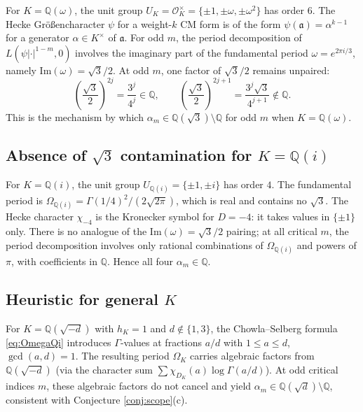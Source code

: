 \documentclass[10pt]{article}
\theoremstyle{definition}
\newcommand{\Q}{\mathbb{Q}}
\newcommand{\OO}{\mathcal{O}}
\newcommand{\OmI}{\Omega_{\Q(i)}}
\begin{document}
For $K = \Q(\omega)$, the unit group $U_K = \OO_K^\times = \{\pm 1, \pm\omega, \pm\omega^2\}$
has order $6$.  The Hecke Gr\"{o}{\ss}encharacter $\psi$ for a weight-$k$ CM form is
of the form $\psi(\mathfrak{a}) = \alpha^{k-1}$ for a generator $\alpha \in K^\times$
of $\mathfrak{a}$.  For odd $m$, the period decomposition of $L(\psi|\cdot|^{1-m}, 0)$
involves the imaginary part of the fundamental period $\omega = e^{2\pi i/3}$, namely
$\mathrm{Im}(\omega) = \sqrt{3}/2$.  At odd $m$, one factor of $\sqrt{3}/2$ remains
unpaired:
\[
  \left(\frac{\sqrt{3}}{2}\right)^{2j} = \frac{3^j}{4^j} \in \Q,
  \qquad
  \left(\frac{\sqrt{3}}{2}\right)^{2j+1} = \frac{3^j\sqrt{3}}{4^{j+1}} \notin \Q.
\]
This is the mechanism by which $\alpha_m \in \Q(\sqrt{3})\setminus\Q$ for odd $m$
when $K = \Q(\omega)$.

\subsection{Absence of \texorpdfstring{$\sqrt{3}$}{sqrt(3)} contamination for \texorpdfstring{$K=\Q(i)$}{K=Q(i)}}

For $K = \Q(i)$, the unit group $U_{\Q(i)} = \{\pm 1, \pm i\}$ has order $4$.
The fundamental period is $\OmI = \Gamma(1/4)^2/(2\sqrt{2\pi})$, which is real
and contains no $\sqrt{3}$.  The Hecke character $\chi_{-4}$ is the Kronecker symbol
for $D = -4$: it takes values in $\{\pm 1\}$ only.  There is no analogue of the
$\mathrm{Im}(\omega) = \sqrt{3}/2$ pairing; at all critical $m$, the period
decomposition involves only rational combinations of $\OmI$ and powers of $\pi$,
with coefficients in $\Q$.  Hence all four $\alpha_m \in \Q$.

\subsection{Heuristic for general \texorpdfstring{$K$}{K}}

For $K = \Q(\sqrt{-d})$ with $h_K = 1$ and $d \notin \{1, 3\}$, the Chowla--Selberg
formula \eqref{eq:OmegaQi} introduces $\Gamma$-values at fractions $a/d$ with
$1 \leq a \leq d$, $\gcd(a,d) = 1$.  The resulting period $\Omega_K$ carries
algebraic factors from $\Q(\sqrt{-d})$ (via the character sum $\sum \chi_{D_K}(a)\log
\Gamma(a/d)$).  At odd critical indices $m$, these algebraic factors do not cancel
and yield $\alpha_m \in \Q(\sqrt{d})\setminus\Q$, consistent with Conjecture
\ref{conj:scope}(c).
\end{document}
